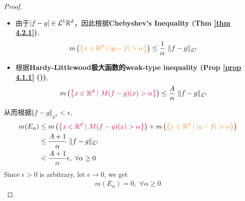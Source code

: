 \begin{thm}
\begin{proof}
			\vspace{2em}
			
			\begin{itemize}
				\item 由于$\left| f - g \right| \in \mathcal{L}^{1}{\mathbb{R}^d}$，因此根据\textbf{Chebyshev's Inequality (Thm \ref{thm 4.2.1})},
				\begin{align}
					m\left( \textcolor{orange}{\left\{ x \in \mathbb{R}^d \mid \left| g - f \right| > \alpha \right\}} \right)
					\leq \frac{1}{\alpha} \,\, \Vert f - g \Vert_{\mathcal{L}^1}
				\end{align}
				
				\vspace{1em}
				
				\item 根据\textbf{Hardy-Littlewood极大函数的weak-type inequality (Prop \ref{prop 4.1.1} ())},
				\begin{align}
					m\left( \textcolor{purple}{\left\{ x \in \mathbb{R}^d \mid M(f - g)(x) > \alpha \right\}} \right)
					\leq \frac{A}{\alpha} \,\, \Vert f - g \Vert_{\mathcal{L}^1}
				\end{align}
			\end{itemize}
		
			\vspace{2em}
			
			从而根据$\Vert f - g \Vert_{\mathcal{L}^1} < \epsilon$,
			\begin{align}
				m(E_\alpha)
				&\leq m\left( \textcolor{purple}{\left\{ x \in \mathbb{R}^d \mid M(f - g)(x) > \alpha \right\}} \right)
				+ m\left( \textcolor{orange}{\left\{ x \in \mathbb{R}^d \mid \left| g - f \right| > \alpha \right\}} \right) \\
				&\leq \frac{A + 1}{\alpha} \,\, \Vert f - g \Vert_{\mathcal{L}^1} \\
				&< \frac{A + 1}{\alpha} \epsilon , \,\, \forall \alpha \geq 0
			\end{align}
			Since $\epsilon > 0$ is arbitrary, let $\epsilon \to 0$, we get
			\begin{align}
				m(E_\alpha) = 0 , \,\, \forall \alpha \geq 0
			\end{align}
		\end{proof}
	\end{thm}


	\ifx\allfiles\undefined

\fi